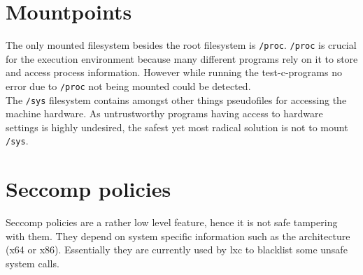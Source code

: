 \section{Mountpoints}

The only mounted filesystem besides the root filesystem is \texttt{/proc}. \texttt{/proc} is crucial for the execution environment because many
different programs rely on it to store and access process information. However while running the test-c-programs no error due
to \texttt{/proc} not being mounted could be detected.\\
The \texttt{/sys} filesystem contains amongst other things pseudofiles for accessing the machine hardware. As untrustworthy programs
having access to hardware settings is highly undesired, the safest yet most radical solution is not to mount \texttt{/sys}.

\section{Seccomp policies}\label{seccomp}

Seccomp policies are a rather low level feature, hence it is not safe tampering with them. They depend on system specific information such
as the architecture (x64 or x86). Essentially they are currently used by lxc to blacklist some unsafe system calls.